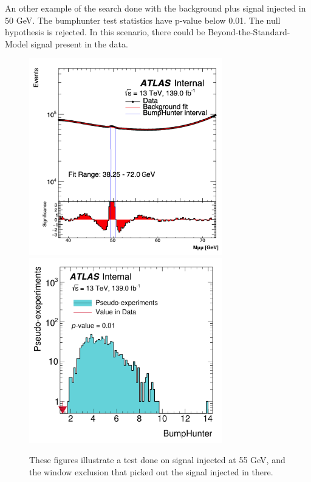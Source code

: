 An other example of the search done with the background plus signal injected in 50 GeV. The bumphunter test statistics have p-value below 0.01. The null hypothesis is rejected. In this scenario, there could be Beyond-the-Standard-Model signal present in the data.

\begin{figure}[!htb]
    \begin{center}
        \includegraphics[width=0.75\textwidth]{figures/chapter_dimuon/SearchBump}
        \includegraphics[width=0.75\textwidth]{figures/chapter_dimuon/bumpHunterStatPlot_bump}
        \caption{
        These figures illustrate a test done on signal injected at 55 GeV, and the window exclusion that picked out the signal injected in there.}
    \end{center}
\end{figure}

